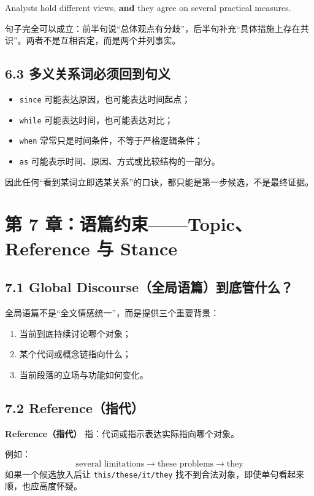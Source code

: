 \documentclass[11pt,a4paper]{ctexart}
\newcommand{\term}[2]{\textbf{#1（#2）}}
\begin{document}
\begin{eng}
Analysts hold different views, \textbf{and} they agree on several practical measures.
\end{eng}
句子完全可以成立：前半句说“总体观点有分歧”，后半句补充“具体措施上存在共识”。两者不是互相否定，而是两个并列事实。

\subsection{6.3 多义关系词必须回到句义}
\begin{itemize}
  \item \texttt{since} 可能表达原因，也可能表达时间起点；
  \item \texttt{while} 可能表达时间，也可能表达对比；
  \item \texttt{when} 常常只是时间条件，不等于严格逻辑条件；
  \item \texttt{as} 可能表示时间、原因、方式或比较结构的一部分。
\end{itemize}

因此任何“看到某词立即选某关系”的口诀，都只能是第一步候选，不是最终证据。

\section{第 7 章：语篇约束——Topic、Reference 与 Stance}

\subsection{7.1 Global Discourse（全局语篇）到底管什么？}
全局语篇不是“全文情感统一”，而是提供三个重要背景：
\begin{enumerate}
  \item 当前到底持续讨论哪个对象；
  \item 某个代词或概念链指向什么；
  \item 当前段落的立场与功能如何变化。
\end{enumerate}

\subsection{7.2 Reference（指代）}
\term{Reference}{指代} 指：代词或指示表达实际指向哪个对象。

例如：
\[
\text{several limitations}
\rightarrow
\text{these problems}
\rightarrow
\text{they}
\]
如果一个候选放入后让 \texttt{this/these/it/they} 找不到合法对象，即使单句看起来顺，也应高度怀疑。
\end{document}
